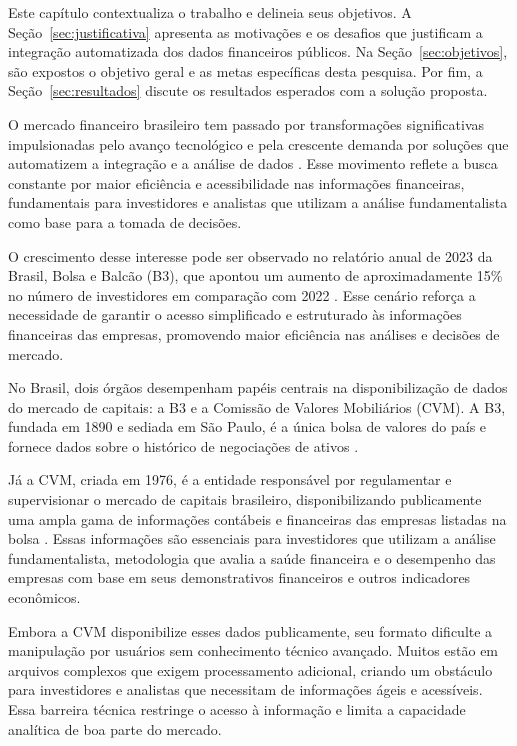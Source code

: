 Este capítulo contextualiza o trabalho e delineia seus objetivos. A Seção~\ref{sec:justificativa} apresenta as motivações e os desafios que justificam a integração automatizada dos dados financeiros públicos. Na Seção~\ref{sec:objetivos}, são expostos o objetivo geral e as metas específicas desta pesquisa. Por fim, a Seção~\ref{sec:resultados} discute os resultados esperados com a solução proposta.

O mercado financeiro brasileiro tem passado por transformações significativas impulsionadas pelo avanço tecnológico e pela crescente demanda por soluções que automatizem a integração e a análise de dados \cite{dantas:2020:comportamento}. Esse movimento reflete a busca constante por maior eficiência e acessibilidade nas informações financeiras, fundamentais para investidores e analistas que utilizam a análise fundamentalista como base para a tomada de decisões.

O crescimento desse interesse pode ser observado no relatório anual de 2023 da Brasil, Bolsa e Balcão (B3), que apontou um aumento de aproximadamente 15\% no número de investidores em comparação com 2022 \cite{b3:2023:relatorio}. Esse cenário reforça a necessidade de garantir o acesso simplificado e estruturado às informações financeiras das empresas, promovendo maior eficiência nas análises e decisões de mercado.

No Brasil, dois órgãos desempenham papéis centrais na disponibilização de dados do mercado de capitais: a B3 e a Comissão de Valores Mobiliários (CVM). A B3, fundada em 1890 e sediada em São Paulo, é a única bolsa de valores do país e fornece dados sobre o histórico de negociações de ativos \cite{b3:2023:investidores}. 

Já a CVM, criada em 1976, é a entidade responsável por regulamentar e supervisionar o mercado de capitais brasileiro, disponibilizando publicamente uma ampla gama de informações contábeis e financeiras das empresas listadas na bolsa \cite{cvm:2009:informacao}. Essas informações são essenciais para investidores que utilizam a análise fundamentalista, metodologia que avalia a saúde financeira e o desempenho das empresas com base em seus demonstrativos financeiros e outros indicadores econômicos.

Embora a CVM disponibilize esses dados publicamente, seu formato dificulte a manipulação por usuários sem conhecimento técnico avançado. Muitos estão em arquivos complexos que exigem processamento adicional, criando um obstáculo para investidores e analistas que necessitam de informações ágeis e acessíveis. Essa barreira técnica restringe o acesso à informação e limita a capacidade analítica de boa parte do mercado.


